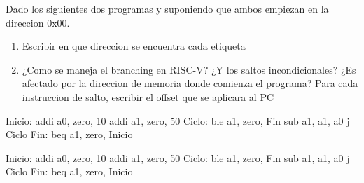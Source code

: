 \begin{enunciado}{\ejercicio}
    Dado los siguientes dos programas y suponiendo que ambos empiezan en la
direccion 0x00.

    \begin{enumerate}
        \item Escribir en que direccion se encuentra cada etiqueta
        \item ¿Como se maneja el branching en RISC-V? ¿Y los saltos incondicionales? ¿Es afectado
        por la direccion de memoria donde comienza el programa? Para cada instruccion de
        salto, escribir el offset que se aplicara al PC
    \end{enumerate}


    \setlength{\columnsep}{30pt} %
    \begin{multicols}{2}
    
        \begin{riscv}
    Inicio: addi a0, zero, 10
    addi a1, zero, 50
    Ciclo: ble a1, zero, Fin
    sub a1, a1, a0
    j Ciclo
    Fin: beq a1, zero, Inicio
        \end{riscv}
        \columnbreak
        \begin{riscv}
    Inicio: addi a0, zero, 10
    addi a1, zero, 50
    Ciclo: ble a1, zero, Fin
    sub a1, a1, a0
    j Ciclo
    Fin: beq a1, zero, Inicio
        \end{riscv}
    
    \end{multicols}
    
    

    
    \end{enunciado}
    